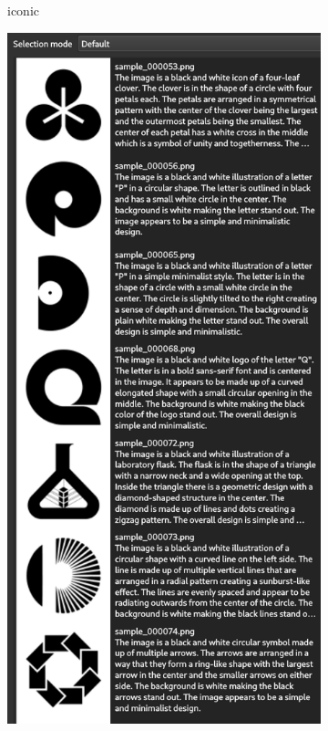 \documentclass[12pt, %
openright, 
oneside, %
a4paper,    %
brazil]{facom-ufu-abntex2}
\begin{document}
\begin{figure}[H]
\begin{subfigure}{0.2\textwidth}
      \caption{iconic}
    \end{subfigure}
    \begin{subfigure}{0.2\textwidth}
      \centering
      \includegraphics[width=\linewidth]{minimalistic.png}

\end{subfigure}
\end{figure}
\end{document}
